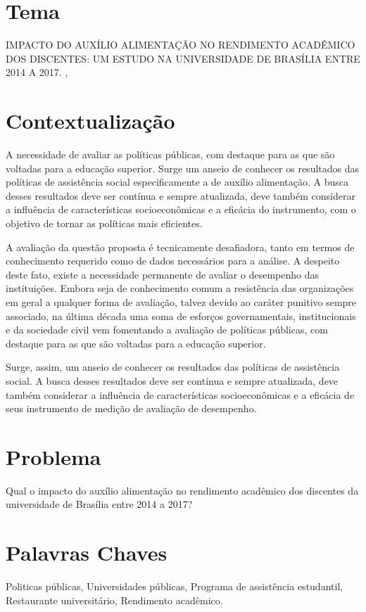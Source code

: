 \section{Tema}%
IMPACTO DO AUXÍLIO ALIMENTAÇÃO NO RENDIMENTO ACADÊMICO DOS DISCENTES: UM ESTUDO NA UNIVERSIDADE DE BRASÍLIA ENTRE 2014 A 2017.
\cite{VIEIRADASILVA2016AVALIACAOUnB},%

\section{Contextualização}%
A necessidade de avaliar as políticas públicas, com destaque para as que são voltadas para a educação superior. Surge um anseio de conhecer os resultados das políticas de assistência social especificamente a de auxílio alimentação. A busca desses resultados deve ser contínua e sempre atualizada, deve também considerar a influência de características socioeconômicas e a eficácia do instrumento, com o objetivo de tornar as políticas mais eficientes.


A avaliação da questão proposta é tecnicamente desafiadora, tanto em termos de conhecimento requerido como de dados necessários para a análise. A despeito deste fato, existe a necessidade permanente de avaliar o desempenho das instituições. Embora seja de conhecimento comum a resistência das organizações em geral a qualquer forma de avaliação, talvez devido ao caráter punitivo sempre associado, na última década uma soma de esforços governamentais, institucionais e da sociedade civil vem fomentando a avaliação de  políticas públicas, com destaque para as que são voltadas para a educação superior.


Surge, assim, um anseio de conhecer os resultados das políticas de assistência social. A busca desses resultados deve ser contínua e sempre atualizada, deve também considerar a influência de características socioeconômicas e a eficácia de seus instrumento de medição de avaliação de desempenho.

\section{Problema}%
Qual o impacto do auxílio alimentação no rendimento acadêmico dos discentes da universidade de Brasília entre 2014 a 2017?

\section{Palavras Chaves}%
Politicas públicas, Universidades públicas, Programa de assistência estudantil, Restaurante universitário, Rendimento acadêmico.


